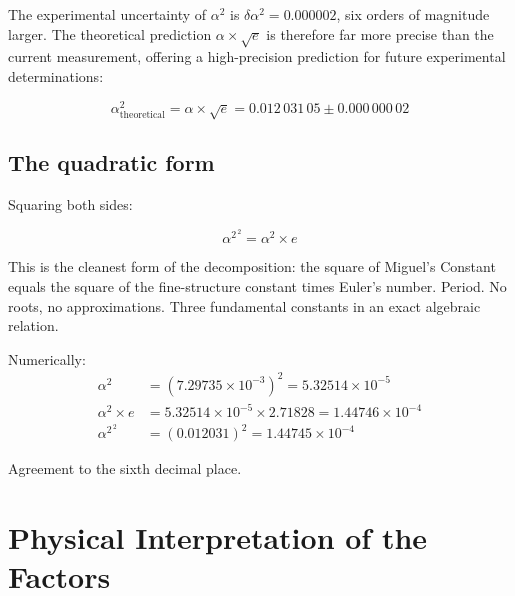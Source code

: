 \documentclass[12pt,a4paper,twoside]{article}
\newcommand{\alphaii}{\alpha^{2}}
\begin{document}
The experimental uncertainty of $\alphaii$ is $\delta\alphaii = 0.000002$, six orders of magnitude larger. The theoretical prediction $\alpha \times \sqrt{e}$ is therefore far more precise than the current measurement, offering a high-precision prediction for future experimental determinations:

\begin{equation}
\alphaii_{\text{theoretical}} = \alpha \times \sqrt{e} = 0.012\,031\,05 \pm 0.000\,000\,02
\label{eq:previsao}
\end{equation}

\subsection{The quadratic form}

Squaring both sides:

\begin{equationbox}[title={Quadratic Form}]
\begin{equation}
\boxed{\alphaii^{\,2} = \alpha^2 \times e}
\label{eq:quadratica}
\end{equation}
\end{equationbox}

\noindent This is the cleanest form of the decomposition: the square of Miguel's Constant equals the square of the fine-structure constant times Euler's number. Period. No roots, no approximations. Three fundamental constants in an exact algebraic relation.

Numerically:
\begin{align}
\alpha^2 &= (7.29735 \times 10^{-3})^2 = 5.32514 \times 10^{-5} \\
\alpha^2 \times e &= 5.32514 \times 10^{-5} \times 2.71828 = 1.44746 \times 10^{-4} \\
\alphaii^{\,2} &= (0.012031)^2 = 1.44745 \times 10^{-4}
\end{align}

Agreement to the sixth decimal place.



\section{Physical Interpretation of the Factors}
\label{sec:fatores}
\end{document}
